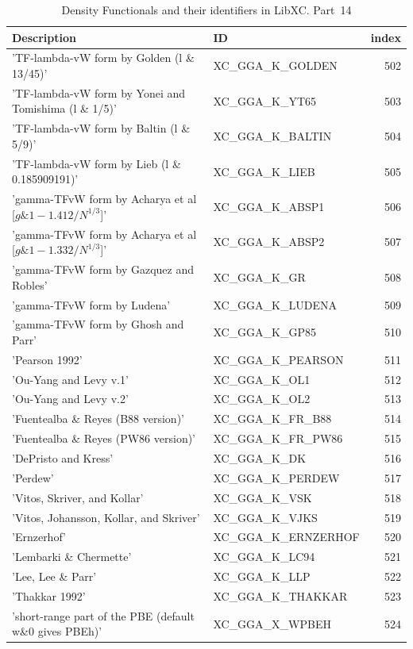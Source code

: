 \documentclass[final,12pt,makeidx,DIV=calc]{article}
\begin{document}
{{{{{{\begin{table}[!h]
\caption{Density Functionals and their identifiers in LibXC. Part~14}
\begin{center}
\begin{tabular}{llr}
\hline
\hline
Description & ID & index\\
\hline
  'TF-lambda-vW form by Golden (l \& 13/45)' & XC\_GGA\_K\_GOLDEN  &502\\
  'TF-lambda-vW form by Yonei and Tomishima (l \& 1/5)' & XC\_GGA\_K\_YT65  &503\\
  'TF-lambda-vW form by Baltin (l \& 5/9)' & XC\_GGA\_K\_BALTIN  &504\\
  'TF-lambda-vW form by Lieb (l \& 0.185909191)' & XC\_GGA\_K\_LIEB  &505\\
  'gamma-TFvW form by Acharya et al [$g \& 1 - 1.412/N^{1/3}$]' & XC\_GGA\_K\_ABSP1  &506\\
  'gamma-TFvW form by Acharya et al [$g \& 1 - 1.332/N^{1/3}$]' & XC\_GGA\_K\_ABSP2  &507\\
  'gamma-TFvW form by Gazquez and Robles' & XC\_GGA\_K\_GR  &508\\
  'gamma-TFvW form by Ludena' & XC\_GGA\_K\_LUDENA  &509\\
  'gamma-TFvW form by Ghosh and Parr' & XC\_GGA\_K\_GP85  &510\\
  'Pearson 1992' & XC\_GGA\_K\_PEARSON  &511\\
  'Ou-Yang and Levy v.1' & XC\_GGA\_K\_OL1  &512\\
  'Ou-Yang and Levy v.2' & XC\_GGA\_K\_OL2  &513\\
  'Fuentealba \& Reyes (B88 version)' & XC\_GGA\_K\_FR\_B88  &514\\
  'Fuentealba \& Reyes (PW86 version)' & XC\_GGA\_K\_FR\_PW86  &515\\
  'DePristo and Kress' & XC\_GGA\_K\_DK  &516\\
  'Perdew' & XC\_GGA\_K\_PERDEW  &517\\
  'Vitos, Skriver, and Kollar' & XC\_GGA\_K\_VSK  &518\\
  'Vitos, Johansson, Kollar, and Skriver' & XC\_GGA\_K\_VJKS  &519\\
  'Ernzerhof' & XC\_GGA\_K\_ERNZERHOF  &520\\
  'Lembarki \& Chermette' & XC\_GGA\_K\_LC94  &521\\
  'Lee, Lee \& Parr' & XC\_GGA\_K\_LLP  &522\\
  'Thakkar 1992' & XC\_GGA\_K\_THAKKAR  &523\\
  'short-range part of the PBE (default w\&0 gives PBEh)' & XC\_GGA\_X\_WPBEH  &524\\

\end{tabular}
\end{center}
\end{table}}}}}}}
\end{document}
